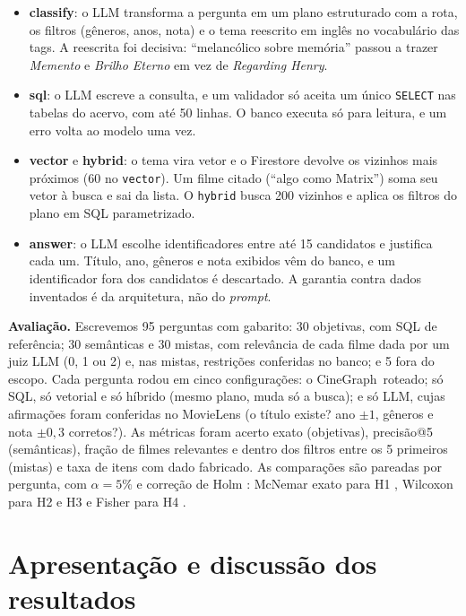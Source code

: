 \documentclass[11pt,a4paper]{article}
\newcommand{\cg}{CineGraph}
\newcommand{\code}[1]{\texttt{#1}}
\begin{document}
\begin{itemize}
  \item \textbf{classify}: o LLM transforma a pergunta em um plano estruturado com a rota, os
        filtros (gêneros, anos, nota) e o tema reescrito em inglês no vocabulário das tags.
        A reescrita foi decisiva: \enquote{melancólico sobre memória} passou a trazer
        \emph{Memento} e \emph{Brilho Eterno} em vez de \emph{Regarding Henry}.
  \item \textbf{sql}: o LLM escreve a consulta, e um validador só aceita um único
        \code{SELECT} nas tabelas do acervo, com até 50 linhas. O banco executa só para
        leitura, e um erro volta ao modelo uma vez.
  \item \textbf{vector} e \textbf{hybrid}: o tema vira vetor e o Firestore devolve os
        vizinhos mais próximos (60 no \code{vector}). Um filme citado (\enquote{algo como
        Matrix}) soma seu vetor à busca e sai da lista. O \code{hybrid} busca 200 vizinhos e
        aplica os filtros do plano em SQL parametrizado.
  \item \textbf{answer}: o LLM escolhe identificadores entre até 15 candidatos e justifica
        cada um. Título, ano, gêneros e nota exibidos vêm do banco, e um identificador fora
        dos candidatos é descartado. A garantia contra dados inventados é da arquitetura,
        não do \emph{prompt}.
\end{itemize}

\textbf{Avaliação.} Escrevemos 95 perguntas com gabarito: 30 objetivas, com SQL de
referência; 30 semânticas e 30 mistas, com relevância de cada filme dada por um juiz LLM
(0, 1 ou 2) e, nas mistas, restrições conferidas no banco; e 5 fora do escopo. Cada pergunta
rodou em cinco configurações: o \cg\ roteado; só SQL, só vetorial e só híbrido (mesmo plano,
muda só a busca); e só LLM, cujas afirmações foram conferidas no MovieLens (o título existe?
ano $\pm1$, gêneros e nota $\pm0{,}3$ corretos?). As métricas foram acerto exato
(objetivas), precisão@5 (semânticas), fração de filmes relevantes e dentro dos filtros entre
os 5 primeiros (mistas) e taxa de itens com dado fabricado. As comparações são pareadas por
pergunta, com $\alpha=5\%$ e correção de Holm \cite{holm1979}: McNemar exato para H1
\cite{mcnemar1947}, Wilcoxon para H2 e H3 \cite{wilcoxon1945} e Fisher para H4
\cite{fisher1922}.

\section{Apresentação e discussão dos resultados}
\end{document}
